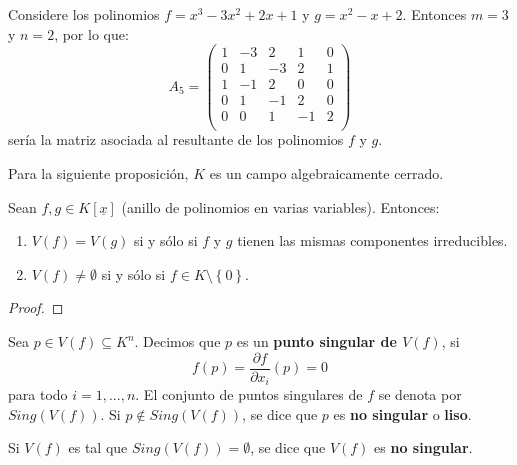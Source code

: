 \documentclass[12pt]{report}
\newcounter{it}
\theoremstyle{largebreak}
\begin{document}
    \begin{sol}
        
    \end{sol}

    \begin{exa}
        Considere los polinomios $f=x^3-3x^2+2x+1$ y $g=x^2-x+2$. Entonces $m=3$ y $n=2$, por lo que:
        \begin{equation*}
            A_{5}=\left(
                \begin{array}{ccccc}
                    1 & -3 & 2 & 1 & 0 \\
                    0 & 1 & -3 & 2 & 1 \\
                    1 & -1 & 2 & 0 & 0 \\
                    0 & 1 & -1 & 2 & 0 \\
                    0 & 0 & 1 & -1 & 2 \\
                \end{array}
            \right)
        \end{equation*}
        sería la matriz asociada al resultante de los polinomios $f$ y $g$.
    \end{exa}

    Para la siguiente proposición, $K$ es un campo algebraicamente cerrado.

    \begin{propo}
        Sean $f,g\in K[\underline{x}]$ (anillo de polinomios en varias variables). Entonces:
        \begin{enumerate}
            \item $V(f)=V(g)$ si y sólo si $f$ y $g$ tienen las mismas componentes irreducibles.
            \item $V(f)\neq\emptyset$ si y sólo si $f\in K\setminus\left\{0\right\}$.
        \end{enumerate}
    \end{propo}

    \begin{proof}
        
    \end{proof}

    \begin{mydef}
        Sea $p\in V(f)\subseteq K^n$. Decimos que $p$ es un \textbf{punto singular de $V(f)$}, si
        \begin{equation*}
            f(p)=\frac{\partial f}{\partial x_i}(p)=0
        \end{equation*}
        para todo $i=1,...,n$. El conjunto de puntos singulares de $f$ se denota por $Sing(V(f))$. Si $p\notin Sing(V(f))$, se dice que $p$ es \textbf{no singular} o \textbf{liso}.

        Si $V(f)$ es tal que $Sing(V(f))=\emptyset$, se dice que $V(f)$ es \textbf{no singular}.
    \end{mydef}
\end{document}
